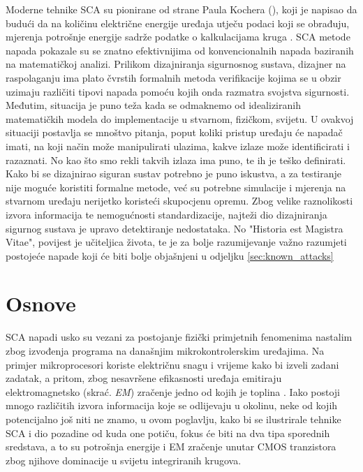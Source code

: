 \documentclass[times, utf8, diplomski]{fer}
\begin{document}
Moderne tehnike SCA su pionirane od strane Paula Kochera (\citeyear{kocher1996timing, kocher1999differential, kocher2004security}), koji je napisao da budući da na količinu električne energije uređaja utječu podaci koji se obrađuju, mjerenja potrošnje energije sadrže podatke o kalkulacijama kruga \citep{kocher2011introduction}. SCA metode napada pokazale su se znatno efektivnijima od konvencionalnih napada baziranih na matematičkoj analizi. Prilikom dizajniranja sigurnosnog sustava, dizajner na raspolaganju ima plato čvrstih formalnih metoda verifikacije kojima se u obzir uzimaju različiti tipovi napada pomoću kojih onda razmatra svojstva sigurnosti. Međutim, situacija je puno teža kada se odmaknemo od idealiziranih matematičkih modela do implementacije u stvarnom, fizičkom, svijetu. U ovakvoj situaciji postavlja se mnoštvo pitanja, poput koliki pristup uređaju će napadač imati, na koji način može manipulirati ulazima, kakve izlaze može identificirati i razaznati. No kao što smo rekli takvih izlaza ima puno, te ih je teško definirati. Kako bi se dizajnirao siguran sustav potrebno je puno iskustva, a za testiranje nije moguće koristiti formalne metode, već su potrebne simulacije i mjerenja na stvarnom uređaju nerijetko koristeći skupocjenu opremu. Zbog velike raznolikosti izvora informacija te nemogućnosti standardizacije, najteži dio dizajniranja sigurnog sustava je upravo detektiranje nedostataka. No "Historia est Magistra Vitae", povijest je učiteljica života, te je za bolje razumijevanje važno razumjeti postojeće napade koji će biti bolje objašnjeni u odjeljku \ref{sec:known_attacks}

\section{Osnove}

SCA napadi usko su vezani za postojanje fizički primjetnih fenomenima nastalim zbog izvođenja programa na današnjim mikrokontrolerskim uređajima. Na primjer mikroprocesori koriste električnu snagu i vrijeme kako bi izveli zadani zadatak, a pritom, zbog nesavršene efikasnosti uređaja emitiraju elektromagnetsko (skrać. \emph{EM}) zračenje jedno od kojih je toplina \citep{standaert2010introduction}. Iako postoji mnogo različitih izvora informacija koje se odlijevaju u okolinu, neke od kojih potencijalno još niti ne znamo, u ovom poglavlju, kako bi se ilustrirale tehnike SCA i dio pozadine od kuda one potiču, fokus će biti na dva tipa sporednih sredstava, a to su potrošnja energije i EM zračenje unutar CMOS tranzistora zbog njihove dominacije u svijetu integriranih krugova.
\end{document}
